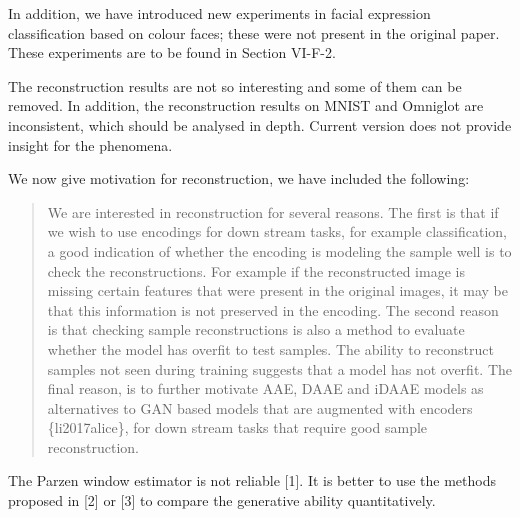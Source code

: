 \documentclass{article}
\begin{document}
\begin{figure}

\end{figure}


In addition, we have introduced new experiments in facial expression classification based on colour faces; these were not present in the original paper.  These experiments are to be found in {\color{red} Section VI-F-2}.

{\color{blue}
The reconstruction results are not so interesting and some of them can be removed. In addition, the reconstruction results on MNIST and Omniglot are inconsistent, which should be analysed in depth. Current version does not provide insight for the phenomena.}\\

{\color{red} 
We now give motivation for reconstruction, we have included the following:

\begin{quote}
We are interested in reconstruction for several reasons. The first is that if we wish to use encodings for down stream tasks, for example classification, a good indication of whether the encoding is modeling the sample well is to check the reconstructions. For example if the reconstructed image is missing certain features that were present in the original images, it may be that this information is not preserved in the encoding. The second reason is that checking sample reconstructions is also a method to evaluate whether the model has overfit to test samples. The ability to reconstruct samples not seen during training suggests that a model has not overfit. The final reason, is to further motivate AAE, DAAE and iDAAE models as alternatives to GAN based models that are augmented with encoders \{li2017alice\}, for down stream tasks that require good sample reconstruction.
\end{quote}

}



{\color{blue}
The Parzen window estimator is not reliable [1]. It is better to use the methods proposed in [2] or [3] to compare the generative ability quantitatively.}\\
\end{document}
